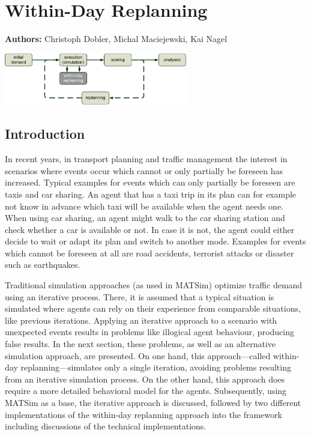 \chapter{Within-Day Replanning}
\label{ch:withinday}

\hfill \textbf{Authors:} Christoph Dobler, Michal Maciejewski, Kai Nagel

\begin{center} \includegraphics[width=0.6\textwidth, angle=0]{extending/figures/WithinDayReplanning/WithinDayMATSimLoop} \end{center}

\section{Introduction}
In recent years, in transport planning and traffic management the interest in scenarios where events occur which cannot or only partially be foreseen has increased. Typical examples for events which can only partially be foreseen are taxis and car sharing. An agent that has a taxi trip in its plan can for example not know in advance which taxi will be available when the agent needs one. When using car sharing, an agent might walk to the car sharing station and check whether a car is available or not. In case it is not, the agent could either decide to wait or adapt its plan and switch to another mode. Examples for events which cannot be foreseen at all are road accidents, terrorist attacks or disaster such as earthquakes.

Traditional simulation approaches (as used in MATSim) optimize traffic demand using an iterative process. There, it is assumed that a typical situation is simulated where agents can rely on their experience from comparable situations, like previous iterations. Applying an iterative approach to a scenario with unexpected events results in problems like illogical agent behaviour, producing false results. In the next section, these problems, as well as an alternative simulation approach, are presented. On one hand, this approach---called within-day replanning---simulates only a single iteration, avoiding problems resulting from an iterative simulation process. On the other hand, this approach does require a more detailed behavioral model for the agents. Subsequently, using MATSim as a base, the iterative approach is discussed, followed by two different implementations of the within-day replanning approach into the framework including discussions of the technical implementations.


